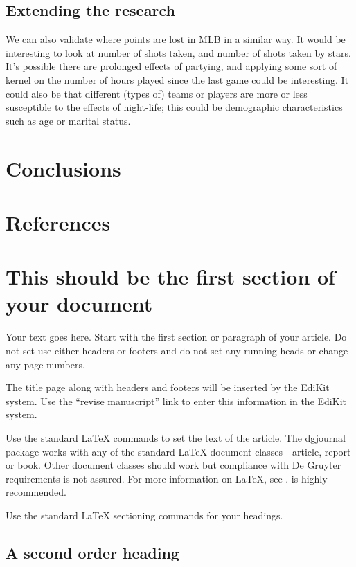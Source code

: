 \documentclass[letterpaper,12pt]{article}
\begin{document}
\subsection{Extending the research}
We can also validate where points are lost in MLB in a similar way.
It would be interesting to look at number of shots taken, and number of shots taken by stars.
It's possible there are prolonged effects of partying, and applying some sort of kernel
on the number of hours played since the last game could be interesting. It could also be
that different (types of) teams or players are more or less susceptible to the effects
of night-life; this could be demographic characteristics such as age or marital status.

\section{Conclusions}

\section{References}




\section{This should be the first section of your document}

Your text goes here. Start with the first section or paragraph of your
article. Do not set use either headers or footers and do not set any running
heads or change any page numbers.

The title page along with headers and footers will be inserted by the EdiKit
system. Use the ``revise manuscript'' link to enter this information in the
EdiKit system.

Use the standard LaTeX commands to set the text of the article. The dgjournal
package works with any of the standard LaTeX document classes - article, report
or book. Other document classes should work but compliance with De Gruyter
requirements is not assured. For more information on LaTeX, see
\cite{lamport,mittelbach,oetiker}. \cite{mittelbach} is highly recommended.

Use the standard LaTeX sectioning commands for your headings.

\subsection{A second order heading}
\end{document}

